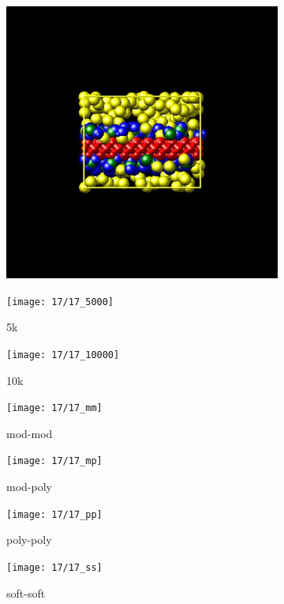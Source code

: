 \documentclass[a4paper]{article}
\begin{document}
\begin{figure}[H]
\begin{subfigure}{0.3\textwidth}
  \centering
  \includegraphics[width=\linewidth,keepaspectratio]{start}
  \caption{}
\end{subfigure}
\begin{subfigure}{0.3\textwidth}
  \centering
  \texttt{[image: 17/17\_5000]}
  \caption{5k}
\end{subfigure}
\begin{subfigure}{0.3\textwidth}
  \centering
  \texttt{[image: 17/17\_10000]}
  \caption{10k}
\end{subfigure}
\caption{}
\label{fig_1}
\end{figure}

\begin{figure}[H]
\begin{subfigure}{0.24\textwidth}
  \centering
  \texttt{[image: 17/17\_mm]}
  \caption{mod-mod}
\end{subfigure}
\begin{subfigure}{0.24\textwidth}
  \centering
  \texttt{[image: 17/17\_mp]}
  \caption{mod-poly}
\end{subfigure}
\begin{subfigure}{0.24\textwidth}
  \centering
  \texttt{[image: 17/17\_pp]}
  \caption{poly-poly}
\end{subfigure}
\begin{subfigure}{0.24\textwidth}
  \centering
  \texttt{[image: 17/17\_ss]}
  \caption{soft-soft}
\end{subfigure}
\caption{}
\label{fig_1}
\end{figure}
\end{document}

